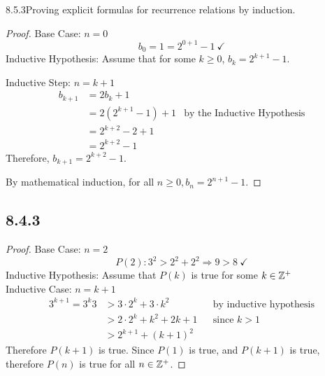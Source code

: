 \begin{question}{8.5.3}{Proving explicit formulas for recurrence relations by induction.}
  \begin{proof}
    Base Case: $n = 0$
    \[
      b_0 = 1 = 2^{0+1}-1~\checkmark
    \]
    Inductive Hypothesis: Assume that for some $k\geq 0$, $b_k=2^{k+1}-1$.

    Inductive Step: $n=k+1$
    \begin{align*}
      b_{k+1} & = 2b_{k}+1                                            \\
              & = 2(2^{k+1}-1)+1 & \text{by the Inductive Hypothesis} \\
              & = 2^{k+2}-2+1                                         \\
              & = 2^{k+2}-1
    \end{align*}
    Therefore, $b_{k+1}=2^{k+2}-1$.

    By mathematical induction, for all $n \geq 0, b_n = 2^{n+1}-1$.
  \end{proof}
\end{question}

\subsection*{8.4.3}
\begin{enumerate}
  \begin{proof}
    Base Case: $n = 2$
    \[
      P(2): 3^2 > 2^2 + 2^2 \Rightarrow 9 > 8~\checkmark
    \]
    Inductive Hypothesis: Assume that $P(k)$ is true for some $k \in \mathbb{Z}^+$ \\
    Inductive Case: $n = k + 1$
    \begin{align*}
      3^{k+1} = 3^k3 & > 3\cdot 2^k + 3\cdot k^2   &  & \text{by inductive hypothesis} \\
                     & > 2\cdot 2^k + k^2 + 2k + 1 &  & \text{since $k>1$}             \\
                     & > 2^{k+1} + (k+1)^2
    \end{align*}
    Therefore $P(k+1)$ is true. Since $P(1)$ is true, and $P(k+1)$ is true, therefore $P(n)$ is true for all $n \in \mathbb{Z}^+$.
  \end{proof}
\end{enumerate}

